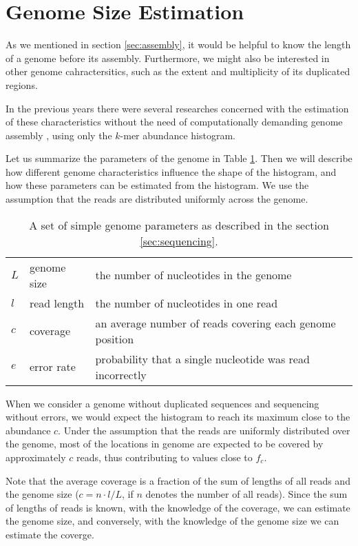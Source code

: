 \section{Genome Size Estimation}
\label{sec:intro-estimation}
As we mentioned in section \ref{sec:assembly}, it would be helpful to know the length of a genome 
before its assembly. Furthermore, we might also be interested in other genome cahractersitics,
such as the extent and multiplicity of its duplicated regions.

In the previous years there were several researches concerned with the estimation 
of these characteristics without the need of computationally demanding 
genome assembly \cite{Hozza2015, Williams2013, Melsted2014, Sivadasan2016}, using only the $k$-mer 
abundance histogram.

\medskip

Let us summarize the parameters of the genome in Table \ref{tab:genome-parameters}.
Then we will describe how different genome characteristics influence the shape of the histogram,
and how these parameters can be estimated from the histogram. We use the assumption that
the reads are distributed uniformly across the genome. 

\begin{table}[h!]
\centering
\begin{tabular}{ l l l }
 $L$ & genome size & the number of nucleotides in the genome \\  
 $l$ & read length & the number of nucleotides in one read \\
 $c$ & coverage & an average number of reads covering each genome position \\ 
 $e$ & error rate & probability that a single nucleotide was read incorrectly   
\end{tabular}
\caption{A set of simple genome parameters as described in the section \ref{sec:sequencing}.
\label{tab:genome-parameters}}
\end{table}

When we consider a genome without duplicated sequences and sequencing without errors, we
would expect the histogram to reach its maximum close to the abundance $c$.
Under the assumption that the reads are uniformly distributed over the genome,
most of the locations in genome are expected to be covered by approximately $c$ reads,
thus contributing to values close to $f_c$.

Note that the average coverage is a fraction of the sum of lengths of all reads
and the genome size ($c = n \cdot l/L$, if $n$ denotes the number of all reads). 
Since the sum of lengths of reads is known, with the knowledge of the coverage, we can estimate the 
genome size, and conversely, with the knowledge of the genome size we can estimate the coverge.

